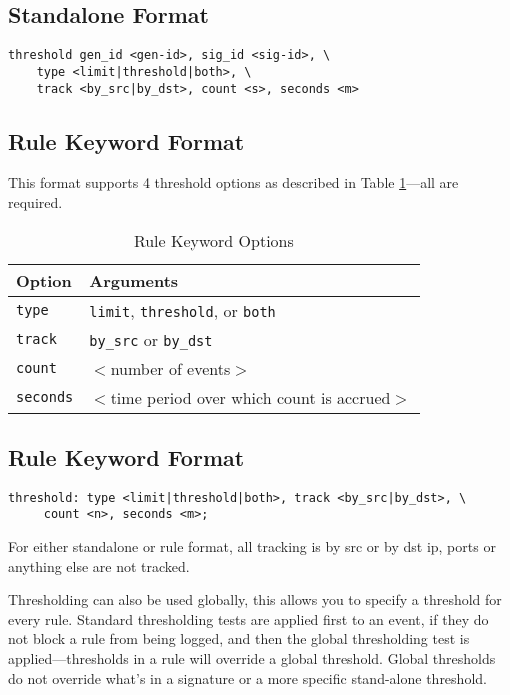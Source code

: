 \documentclass[english]{report}
\begin{document}
\subsection{Standalone Format}
\begin{verbatim}
threshold gen_id <gen-id>, sig_id <sig-id>, \
    type <limit|threshold|both>, \
    track <by_src|by_dst>, count <s>, seconds <m>  
\end{verbatim}


\subsection{Rule Keyword Format}

This format supports 4 threshold options as described in Table \ref{rule_keyword_options}---all are required.

\begin{table}[!hbpt]
\caption{Rule Keyword Options\label{rule_keyword_options}}
\begin{center}\begin{tabular}{| l | p{3.5in} |}
\hline
\textbf{Option} & \textbf{Arguments}\\
\hline
\hline
\texttt{type} & \texttt{limit}, \texttt{threshold}, or \texttt{both} \\
\hline
\texttt{track} & \texttt{by\_src} or \texttt{by\_dst} \\
\hline
\texttt{count} & $<$number of events$>$ \\
\hline
\texttt{seconds} & $<$time period over which count is accrued$>$ \\
\hline
\end{tabular}\end{center}
\end{table}

\subsection{Rule Keyword Format}
\begin{verbatim}
threshold: type <limit|threshold|both>, track <by_src|by_dst>, \
     count <n>, seconds <m>;
\end{verbatim}

For either standalone or rule format, all tracking is by src or by dst ip,
ports or anything else are not tracked.

Thresholding can also be used globally, this allows you to specify a threshold
for every rule.  Standard thresholding tests are applied first to an event, if
they do not block a rule from being logged, and then the global thresholding
test is applied---thresholds in a rule will override a global threshold. Global 
thresholds do not override what's in a signature or a more specific stand-alone 
threshold.
\end{document}
